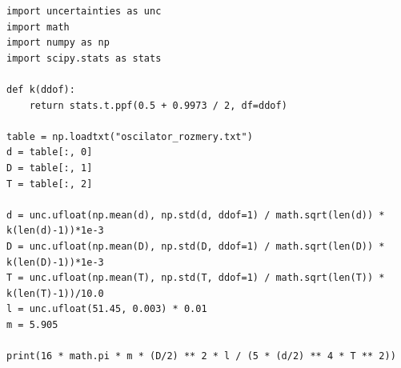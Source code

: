 \documentclass[a4paper,11pt]{article}
\begin{document}
\begin{lstlisting}[caption={Výpočet modulu pružnosti dynamickou metodou}]
import uncertainties as unc
import math
import numpy as np
import scipy.stats as stats

def k(ddof):
    return stats.t.ppf(0.5 + 0.9973 / 2, df=ddof)

table = np.loadtxt("oscilator_rozmery.txt")
d = table[:, 0]
D = table[:, 1]
T = table[:, 2]

d = unc.ufloat(np.mean(d), np.std(d, ddof=1) / math.sqrt(len(d)) * k(len(d)-1))*1e-3
D = unc.ufloat(np.mean(D), np.std(D, ddof=1) / math.sqrt(len(D)) * k(len(D)-1))*1e-3
T = unc.ufloat(np.mean(T), np.std(T, ddof=1) / math.sqrt(len(T)) * k(len(T)-1))/10.0
l = unc.ufloat(51.45, 0.003) * 0.01
m = 5.905

print(16 * math.pi * m * (D/2) ** 2 * l / (5 * (d/2) ** 4 * T ** 2))
  
\end{lstlisting}
\end{document}
